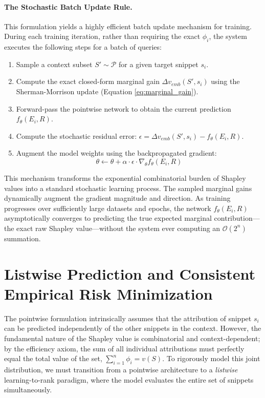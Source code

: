 \documentclass{article}
\begin{document}
\paragraph{The Stochastic Batch Update Rule.}
This formulation yields a highly efficient batch update mechanism for training. During each training iteration, rather than requiring the exact $\phi_i$, the system executes the following steps for a batch of queries:
\begin{enumerate}
    \item Sample a context subset $S' \sim \mathcal{P}$ for a given target snippet $s_i$.
    \item Compute the exact closed-form marginal gain $\Delta v_{emb}(S', s_i)$ using the Sherman-Morrison update (Equation \ref{eq:marginal_gain}).
    \item Forward-pass the pointwise network to obtain the current prediction $f_\theta(E_i, R)$.
    \item Compute the stochastic residual error: $\epsilon = \Delta v_{emb}(S', s_i) - f_\theta(E_i, R)$.
    \item Augment the model weights using the backpropagated gradient: 
    $$ \theta \leftarrow \theta + \alpha \cdot \epsilon \cdot \nabla_\theta f_\theta(E_i, R) $$
\end{enumerate}

This mechanism transforms the exponential combinatorial burden of Shapley values into a standard stochastic learning process. The sampled marginal gains dynamically augment the gradient magnitude and direction. As training progresses over sufficiently large datasets and epochs, the network $f_\theta(E_i, R)$ asymptotically converges to predicting the true expected marginal contribution—the exact raw Shapley value—without the system ever computing an $\mathcal{O}(2^n)$ summation.


\section{Listwise Prediction and Consistent Empirical Risk Minimization}

The pointwise formulation intrinsically assumes that the attribution of snippet $s_i$ can be predicted independently of the other snippets in the context. However, the fundamental nature of the Shapley value is combinatorial and context-dependent; by the efficiency axiom, the sum of all individual attributions must perfectly equal the total value of the set, $\sum_{i=1}^n \phi_i = v(S)$. To rigorously model this joint distribution, we must transition from a pointwise architecture to a \textit{listwise} learning-to-rank paradigm, where the model evaluates the entire set of snippets simultaneously.
\end{document}
